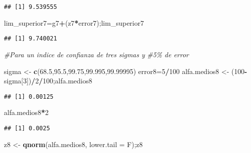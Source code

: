 \documentclass[
]{article}
\newenvironment{Shaded}{\begin{snugshade}}{\end{snugshade}}
\newcommand{\AttributeTok}[1]{\textcolor[rgb]{0.13,0.29,0.53}{#1}}
\newcommand{\CommentTok}[1]{\textcolor[rgb]{0.56,0.35,0.01}{\textit{#1}}}
\newcommand{\DecValTok}[1]{\textcolor[rgb]{0.00,0.00,0.81}{#1}}
\newcommand{\FloatTok}[1]{\textcolor[rgb]{0.00,0.00,0.81}{#1}}
\newcommand{\FunctionTok}[1]{\textcolor[rgb]{0.13,0.29,0.53}{\textbf{#1}}}
\newcommand{\NormalTok}[1]{#1}
\newcommand{\OtherTok}[1]{\textcolor[rgb]{0.56,0.35,0.01}{#1}}
\newcommand{\SpecialCharTok}[1]{\textcolor[rgb]{0.81,0.36,0.00}{\textbf{#1}}}
\begin{document}
\begin{verbatim}
## [1] 9.539555
\end{verbatim}

\begin{Shaded}
\begin{Highlighting}[]
\NormalTok{lim\_superior7}\OtherTok{=}\NormalTok{g7}\SpecialCharTok{+}\NormalTok{(z7}\SpecialCharTok{*}\NormalTok{error7);lim\_superior7}
\end{Highlighting}
\end{Shaded}

\begin{verbatim}
## [1] 9.740021
\end{verbatim}

\begin{Shaded}
\begin{Highlighting}[]
\CommentTok{\#Para un indice de confianza de tres sigmas y }
\CommentTok{\#5\% de error}

\NormalTok{sigma }\OtherTok{\textless{}{-}} \FunctionTok{c}\NormalTok{(}\FloatTok{68.5}\NormalTok{,}\FloatTok{95.5}\NormalTok{,}\FloatTok{99.75}\NormalTok{,}\FloatTok{99.995}\NormalTok{,}\FloatTok{99.99995}\NormalTok{)}
\NormalTok{error8}\OtherTok{=}\DecValTok{5}\SpecialCharTok{/}\DecValTok{100}
\NormalTok{alfa.medios8 }\OtherTok{\textless{}{-}}\NormalTok{ (}\DecValTok{100}\SpecialCharTok{{-}}\NormalTok{sigma[}\DecValTok{3}\NormalTok{])}\SpecialCharTok{/}\DecValTok{2}\SpecialCharTok{/}\DecValTok{100}\NormalTok{;alfa.medios8}
\end{Highlighting}
\end{Shaded}

\begin{verbatim}
## [1] 0.00125
\end{verbatim}

\begin{Shaded}
\begin{Highlighting}[]
\NormalTok{alfa.medios8}\SpecialCharTok{*}\DecValTok{2}
\end{Highlighting}
\end{Shaded}

\begin{verbatim}
## [1] 0.0025
\end{verbatim}

\begin{Shaded}
\begin{Highlighting}[]
\NormalTok{z8 }\OtherTok{\textless{}{-}} \FunctionTok{qnorm}\NormalTok{(alfa.medios8, }\AttributeTok{lower.tail =}\NormalTok{ F);z8}
\end{Highlighting}
\end{Shaded}
\end{document}
